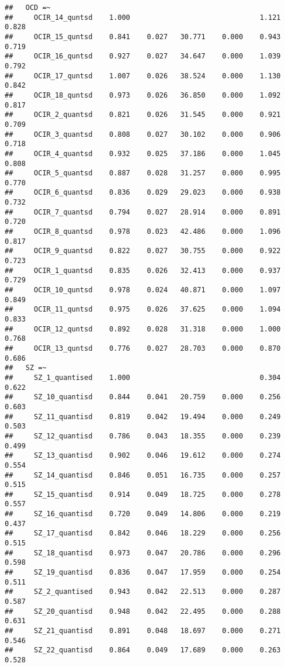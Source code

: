 \documentclass[]{article}
\begin{document}
\begin{verbatim}
##   OCD =~                                                                
##     OCIR_14_quntsd    1.000                               1.121    0.828
##     OCIR_15_quntsd    0.841    0.027   30.771    0.000    0.943    0.719
##     OCIR_16_quntsd    0.927    0.027   34.647    0.000    1.039    0.792
##     OCIR_17_quntsd    1.007    0.026   38.524    0.000    1.130    0.842
##     OCIR_18_quntsd    0.973    0.026   36.850    0.000    1.092    0.817
##     OCIR_2_quantsd    0.821    0.026   31.545    0.000    0.921    0.709
##     OCIR_3_quantsd    0.808    0.027   30.102    0.000    0.906    0.718
##     OCIR_4_quantsd    0.932    0.025   37.186    0.000    1.045    0.808
##     OCIR_5_quantsd    0.887    0.028   31.257    0.000    0.995    0.770
##     OCIR_6_quantsd    0.836    0.029   29.023    0.000    0.938    0.732
##     OCIR_7_quantsd    0.794    0.027   28.914    0.000    0.891    0.720
##     OCIR_8_quantsd    0.978    0.023   42.486    0.000    1.096    0.817
##     OCIR_9_quantsd    0.822    0.027   30.755    0.000    0.922    0.723
##     OCIR_1_quantsd    0.835    0.026   32.413    0.000    0.937    0.729
##     OCIR_10_quntsd    0.978    0.024   40.871    0.000    1.097    0.849
##     OCIR_11_quntsd    0.975    0.026   37.625    0.000    1.094    0.833
##     OCIR_12_quntsd    0.892    0.028   31.318    0.000    1.000    0.768
##     OCIR_13_quntsd    0.776    0.027   28.703    0.000    0.870    0.686
##   SZ =~                                                                 
##     SZ_1_quantised    1.000                               0.304    0.622
##     SZ_10_quantisd    0.844    0.041   20.759    0.000    0.256    0.603
##     SZ_11_quantisd    0.819    0.042   19.494    0.000    0.249    0.503
##     SZ_12_quantisd    0.786    0.043   18.355    0.000    0.239    0.499
##     SZ_13_quantisd    0.902    0.046   19.612    0.000    0.274    0.554
##     SZ_14_quantisd    0.846    0.051   16.735    0.000    0.257    0.515
##     SZ_15_quantisd    0.914    0.049   18.725    0.000    0.278    0.557
##     SZ_16_quantisd    0.720    0.049   14.806    0.000    0.219    0.437
##     SZ_17_quantisd    0.842    0.046   18.229    0.000    0.256    0.515
##     SZ_18_quantisd    0.973    0.047   20.786    0.000    0.296    0.598
##     SZ_19_quantisd    0.836    0.047   17.959    0.000    0.254    0.511
##     SZ_2_quantised    0.943    0.042   22.513    0.000    0.287    0.587
##     SZ_20_quantisd    0.948    0.042   22.495    0.000    0.288    0.631
##     SZ_21_quantisd    0.891    0.048   18.697    0.000    0.271    0.546
##     SZ_22_quantisd    0.864    0.049   17.689    0.000    0.263    0.528

\end{verbatim}
\end{document}

